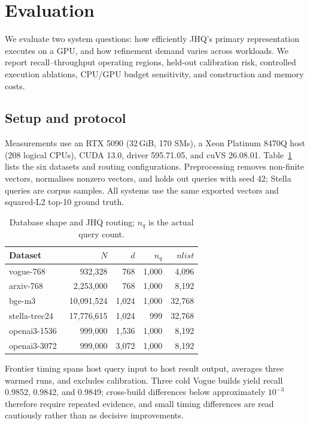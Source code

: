 \section{Evaluation}
\label{sec:experi}
We evaluate two system questions: how efficiently JHQ's primary representation
executes on a GPU, and how refinement demand varies across workloads. We
report recall--throughput operating regions, held-out calibration risk,
controlled execution ablations, CPU/GPU budget sensitivity, and construction
and memory costs.

\subsection{Setup and protocol}
\label{sec:setup}
Measurements use an RTX 5090 (32\,GiB, 170 SMs), a Xeon Platinum 8470Q host
(208 logical CPUs), CUDA 13.0, driver 595.71.05, and cuVS 26.08.01.
Table~\ref{tab:data} lists the six datasets and routing configurations.
Preprocessing removes non-finite vectors, normalises nonzero vectors, and
holds out queries with seed 42; Stella queries are corpus samples. All systems
use the same exported vectors and squared-L2 top-10 ground truth.

\begin{table}[bp]
\centering
\caption{Database shape and JHQ routing; $n_q$ is the actual query count.}
\label{tab:data}
\footnotesize
\begin{tabular}{lrrrr}\toprule
Dataset & $N$ & $d$ & $n_q$ & $\mathit{nlist}$\\\midrule
vogue-768~\cite{data_vogue} & 932,328 & 768 & 1,000 & 4,096\\
arxiv-768~\cite{data_arxiv} & 2,253,000 & 768 & 1,000 & 8,192\\
bge-m3~\cite{data_bge} & 10,091,524 & 1,024 & 1,000 & 32,768\\
stella-trec24~\cite{data_stella} & 17,776,615 & 1,024 & 999 & 32,768\\
openai3-1536~\cite{data_openai1536} & 999,000 & 1,536 & 1,000 & 8,192\\
openai3-3072~\cite{data_openai3072} & 999,000 & 3,072 & 1,000 & 8,192\\\bottomrule
\end{tabular}
\end{table}

Frontier timing spans host query input to host result output, averages three
warmed runs, and excludes calibration. Three cold Vogue builds yield recall
0.9852, 0.9842, and 0.9849; cross-build differences below approximately
$10^{-3}$ therefore require repeated evidence, and small timing differences
are read cautiously rather than as decisive improvements.

